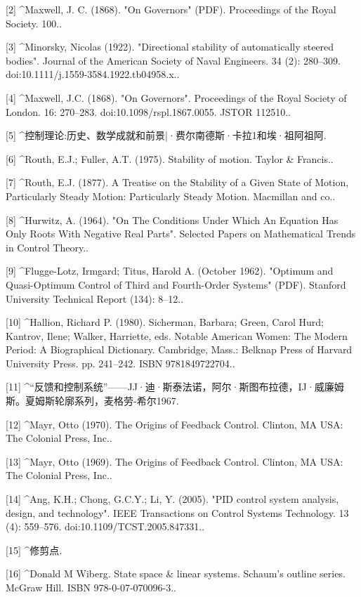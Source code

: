 [2]
^Maxwell, J. C. (1868). "On Governors" (PDF). Proceedings of the Royal Society. 100..

[3]
^Minorsky, Nicolas (1922). "Directional stability of automatically steered bodies". Journal of the American Society of Naval Engineers. 34 (2): 280–309. doi:10.1111/j.1559-3584.1922.tb04958.x..

[4]
^Maxwell, J.C. (1868). "On Governors". Proceedings of the Royal Society of London. 16: 270–283. doi:10.1098/rspl.1867.0055. JSTOR 112510..

[5]
^控制理论:历史、数学成就和前景|·费尔南德斯·卡拉1和埃·祖阿祖阿.

[6]
^Routh, E.J.; Fuller, A.T. (1975). Stability of motion. Taylor & Francis..

[7]
^Routh, E.J. (1877). A Treatise on the Stability of a Given State of Motion, Particularly Steady Motion: Particularly Steady Motion. Macmillan and co..

[8]
^Hurwitz, A. (1964). "On The Conditions Under Which An Equation Has Only Roots With Negative Real Parts". Selected Papers on Mathematical Trends in Control Theory..

[9]
^Flugge-Lotz, Irmgard; Titus, Harold A. (October 1962). "Optimum and Quasi-Optimum Control of Third and Fourth-Order Systems" (PDF). Stanford University Technical Report (134): 8–12..

[10]
^Hallion, Richard P. (1980). Sicherman, Barbara; Green, Carol Hurd; Kantrov, Ilene; Walker, Harriette, eds. Notable American Women: The Modern Period: A Biographical Dictionary. Cambridge, Mass.: Belknap Press of Harvard University Press. pp. 241–242. ISBN 9781849722704..

[11]
^“反馈和控制系统”——JJ·迪·斯泰法诺，阿尔·斯图布拉德，IJ·威廉姆斯。夏姆斯轮廓系列，麦格劳-希尔1967.

[12]
^Mayr, Otto (1970). The Origins of Feedback Control. Clinton, MA USA: The Colonial Press, Inc..

[13]
^Mayr, Otto (1969). The Origins of Feedback Control. Clinton, MA USA: The Colonial Press, Inc..

[14]
^Ang, K.H.; Chong, G.C.Y.; Li, Y. (2005). "PID control system analysis, design, and technology". IEEE Transactions on Control Systems Technology. 13 (4): 559–576. doi:10.1109/TCST.2005.847331..

[15]
^修剪点.

[16]
^Donald M Wiberg. State space & linear systems. Schaum's outline series. McGraw Hill. ISBN 978-0-07-070096-3..

